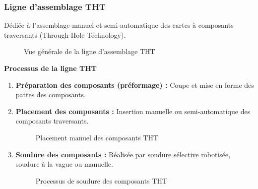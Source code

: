 \subsubsection*{Ligne d'assemblage THT}

Dédiée à l’assemblage manuel et semi-automatique des cartes à composants traversants (Through-Hole Technology).

\begin{figure}[H]
    \centering
    \caption{Vue générale de la ligne d’assemblage THT}
    \label{fig:ligne_tht}
\end{figure}

\textbf{Processus de la ligne THT}

\begin{enumerate}
    \item \textbf{Préparation des composants (préformage) :} Coupe et mise en forme des pattes des composants.
    
    \item \textbf{Placement des composants :} Insertion manuelle ou semi-automatique des composants traversants.
    
    \begin{figure}[H]
        \centering
        \begin{minipage}{0.48\textwidth}
            \centering
            \caption{Placement semi-automatique des composants THT}
            \label{fig:placement_semi_auto}
        \end{minipage}\hfill
        \begin{minipage}{0.48\textwidth}
            \centering
            \caption{Placement manuel des composants THT}
            \label{fig:placement_manuel}
        \end{minipage}
    \end{figure}
    
    \item \textbf{Soudure des composants :} Réalisée par soudure sélective robotisée, soudure à la vague ou manuelle.
    
    \begin{figure}[H]
        \centering
        \caption{Processus de soudure des composants THT}
        \label{fig:soudure_tht}
    \end{figure}


\end{enumerate}
